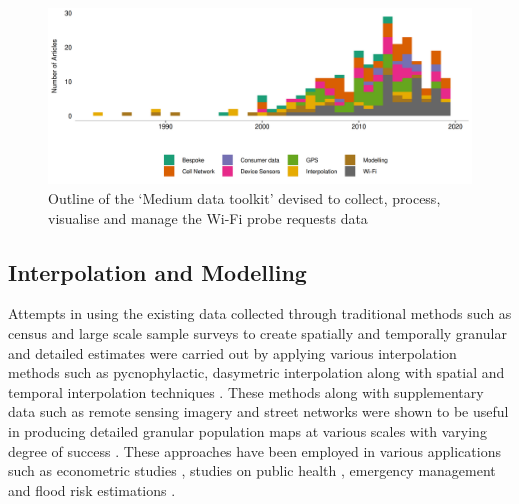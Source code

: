 \begin{figure}
  \includegraphics{images/literature-tech-timeline.png}
  \caption{Outline of the `Medium data toolkit' devised to collect, process, visualise and manage the Wi-Fi probe requests data}
  \label{figure:literature:tech:timeline}
\end{figure}

\subsection{Interpolation and Modelling}

Attempts in using the existing data collected through traditional methods such as census and large scale sample surveys to create spatially and temporally granular and detailed estimates were carried out by applying various interpolation methods such as pycnophylactic, dasymetric interpolation \citep{tobler1979, mennis2003, mennis2006, hawley2005, tapp2010} along with spatial \citep{lam1983,martin1989} and temporal interpolation techniques \citep{glickman1986}.
These methods along with supplementary data such as remote sensing imagery \citep{sutton2001, chen2002} and street networks \citep{reibel2005} were shown to be useful in producing detailed granular population maps at various scales with varying degree of success \citep{dobson2000, bhaduri2002, dobson2003, bhaduri2005, bhaduri2007}.
These approaches have been employed in various applications such as econometric studies \citep{mcdonald1989}, studies on public health \citep{hay2005}, emergency management \citep{kwan2005} and flood risk estimations \citep{smith2016}.


